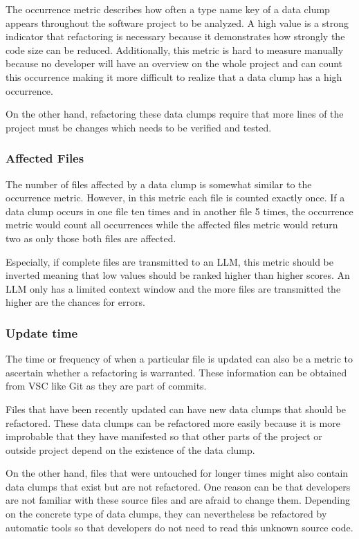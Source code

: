 The occurrence metric describes how often a type name key of a data clump appears throughout the software project to be analyzed. A high value is a strong indicator that refactoring is necessary because it demonstrates how strongly the code size can be reduced. Additionally, this metric is hard to measure manually because no developer will have an overview on the whole project and can count this occurrence making it more difficult to realize that a data clump has a high occurrence.  

On the other hand, refactoring these data clumps require that more lines of the project must be changes which needs to be verified and tested. 

\subsubsection{Affected Files}

The number of files affected by a data clump is somewhat  similar to the occurrence metric. However, in this metric each file is counted exactly once. If a data clump occurs in one file ten times and in another file 5 times, the occurrence metric would count all occurrences while the affected files metric would return two as only those both files are affected. 

Especially, if complete files are transmitted to an \ac{LLM}, this metric should be inverted meaning that low values should be ranked higher than higher scores. An \ac{LLM} only has a limited context window and the more files are transmitted the higher are the chances for errors.  

\subsubsection{Update time}

The time or frequency of when a particular file is updated can also be a metric to ascertain whether a refactoring is warranted. These information can be obtained from \ac{VSC} like Git as they are part of commits.

Files that have been recently updated can have new data clumps that should be refactored. These data clumps can be refactored more easily because it is more improbable that they have manifested so that other parts of the project or outside project depend on the existence of the data clump. 

On the other hand, files that were untouched for longer times might also contain data clumps that exist but are not refactored. One reason can be that developers are not familiar with these source files and are afraid to change them. Depending on the concrete type of data clumps, they can nevertheless be refactored by automatic tools so that developers do not need to read this unknown source code.





